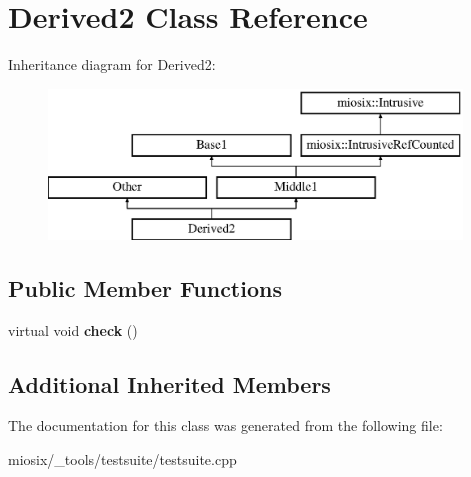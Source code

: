 \hypertarget{class_derived2}{\section{Derived2 Class Reference}
\label{class_derived2}
}
Inheritance diagram for Derived2\-:\begin{figure}[H]
\begin{center}
\leavevmode
\includegraphics[height=4.000000cm]{class_derived2}
\end{center}
\end{figure}
\subsection*{Public Member Functions}
\begin{DoxyCompactItemize}
\item 
\hypertarget{class_derived2_ae8e8831d2e52ef58a2d12bd5e8ec75bc}{virtual void {\bfseries check} ()}\label{class_derived2_ae8e8831d2e52ef58a2d12bd5e8ec75bc}

\end{DoxyCompactItemize}
\subsection*{Additional Inherited Members}


The documentation for this class was generated from the following file\-:\begin{DoxyCompactItemize}
\item 
miosix/\-\_\-tools/testsuite/testsuite.\-cpp\end{DoxyCompactItemize}
